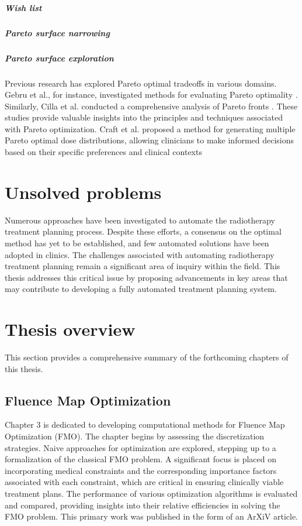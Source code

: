 \subparagraph{Wish list}

\subparagraph{Pareto surface narrowing}

\subparagraph{Pareto surface exploration}
Previous research has explored Pareto optimal tradeoffs in various domains.
Gebru et al., for instance, investigated methods for evaluating Pareto optimality \cite{Gebru2023}.
Similarly, Cilla et al. conducted a comprehensive analysis of Pareto fronts \cite{Cilla2018}.
These studies provide valuable insights into the principles and techniques associated with Pareto optimization.
Craft et al. proposed a method for generating multiple Pareto optimal dose distributions, allowing clinicians to make informed decisions based on their specific preferences and clinical contexts \cite{Craft2007}

\section{Unsolved problems}
Numerous approaches have been investigated to automate the radiotherapy treatment planning process.
Despite these efforts, a consensus on the optimal method has yet to be established, and few automated solutions have been adopted in clinics.
The challenges associated with automating radiotherapy treatment planning remain a significant area of inquiry within the field.
This thesis addresses this critical issue by proposing advancements in key areas that may contribute to developing a fully automated treatment planning system.

\section{Thesis overview}
This section provides a comprehensive summary of the forthcoming chapters of this thesis.

\subsection{Fluence Map Optimization}
Chapter 3 is dedicated to developing computational methods for Fluence Map Optimization (FMO).
The chapter begins by assessing the discretization strategies.
Naive approaches for optimization are explored, stepping up to a formalization of the classical FMO problem.
A significant focus is placed on incorporating medical constraints and the corresponding importance factors associated with each constraint, which are critical in ensuring clinically viable treatment plans.
The performance of various optimization algorithms is evaluated and compared, providing insights into their relative efficiencies in solving the FMO problem.
This primary work was published in the form of an ArXiV article.

